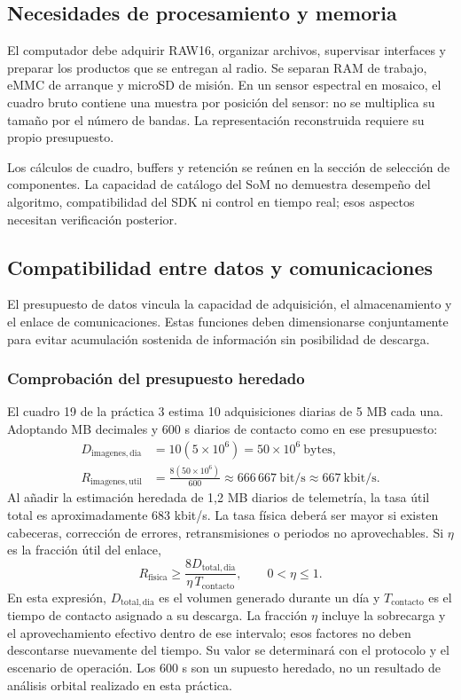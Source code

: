 \documentclass[11pt,letterpaper]{article}
\begin{document}
\subsection{Necesidades de procesamiento y memoria}
El computador debe adquirir RAW16, organizar archivos, supervisar interfaces y preparar los productos que se entregan al radio. Se separan RAM de trabajo, eMMC de arranque y microSD de misión. En un sensor espectral en mosaico, el cuadro bruto contiene una muestra por posición del sensor: no se multiplica su tamaño por el número de bandas. La representación reconstruida requiere su propio presupuesto.

Los cálculos de cuadro, buffers y retención se reúnen en la sección de selección de componentes. La capacidad de catálogo del SoM no demuestra desempeño del algoritmo, compatibilidad del SDK ni control en tiempo real; esos aspectos necesitan verificación posterior.

\subsection{Compatibilidad entre datos y comunicaciones}
\label{sec:datos}
El presupuesto de datos vincula la capacidad de adquisición, el almacenamiento y el enlace de comunicaciones. Estas funciones deben dimensionarse conjuntamente para evitar acumulación sostenida de información sin posibilidad de descarga.

\subsubsection{Comprobación del presupuesto heredado}
El cuadro 19 de la práctica 3 \cite{lab3} estima 10 adquisiciones diarias de 5 MB cada una. Adoptando MB decimales y 600 s diarios de contacto como en ese presupuesto:
\begin{align}
D_{\mathrm{imagenes,dia}}&=10(5\times10^6)=50\times10^6\ \mathrm{bytes},\\
R_{\mathrm{imagenes,util}}&=\frac{8(50\times10^6)}{600}
\approx666\,667\ \mathrm{bit/s}\approx667\ \mathrm{kbit/s}.
\end{align}
Al añadir la estimación heredada de 1,2 MB diarios de telemetría, la tasa útil total es aproximadamente 683 kbit/s. La tasa física deberá ser mayor si existen cabeceras, corrección de errores, retransmisiones o periodos no aprovechables. Si $\eta$ es la fracción útil del enlace,
\begin{equation}
R_{\mathrm{fisica}}\geq\frac{8D_{\mathrm{total,dia}}}{\eta\,T_{\mathrm{contacto}}},\qquad 0<\eta\leq1.
\end{equation}
En esta expresión, $D_{\mathrm{total,dia}}$ es el volumen generado durante un día y $T_{\mathrm{contacto}}$ es el tiempo de contacto asignado a su descarga. La fracción $\eta$ incluye la sobrecarga y el aprovechamiento efectivo dentro de ese intervalo; esos factores no deben descontarse nuevamente del tiempo. Su valor se determinará con el protocolo y el escenario de operación. Los 600 s son un supuesto heredado, no un resultado de análisis orbital realizado en esta práctica.
\end{document}
